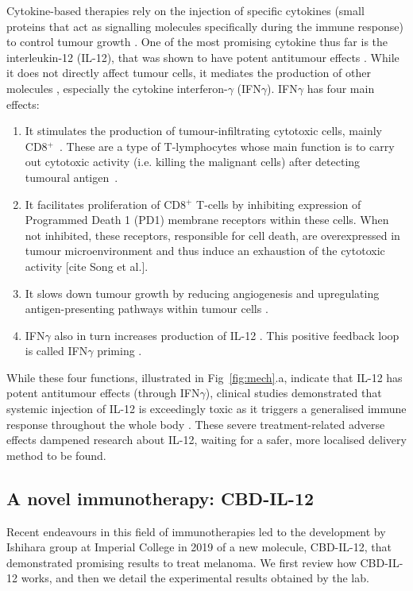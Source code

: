 \documentclass[11pt]{article}
\begin{document}
Cytokine-based therapies rely on the injection of specific cytokines (small proteins that act as signalling molecules specifically during the immune response) to control tumour growth \cite{ioDef}. One of the most promising cytokine thus far is the interleukin-12 (IL-12), that was shown to have potent antitumour effects \cite{il12IsCool}. While it does not directly affect tumour cells, it mediates the production of other molecules \cite{il12CytokineStorm}, especially the cytokine interferon-$\gamma$ (IFN$\gamma$). IFN$\gamma$ has four main effects:
\begin{enumerate}
    \item It stimulates the production of tumour-infiltrating cytotoxic cells, mainly CD8$^+$~\cite{ifngNKProd}\cite{ifnCD8}. These are a type of T-lymphocytes whose main function is to carry out cytotoxic activity (i.e. killing the malignant cells) after detecting tumoural antigen~\cite{cd8Effects}.     
    \item It facilitates proliferation of CD8$^+$ T-cells by inhibiting expression of Programmed Death 1 (PD1) membrane receptors within these cells. When not inhibited, these receptors, responsible for cell death, are overexpressed in tumour microenvironment and thus induce an exhaustion of the cytotoxic activity [cite Song et al.].  
    \item It slows down tumour growth by reducing angiogenesis \cite{ifngAngiogenesis} and upregulating antigen-presenting pathways within tumour cells \cite{ifngAntigenExposure}.
    \item IFN$\gamma$ also in turn increases production of IL-12 \cite{wang}. This positive feedback loop is called IFN$\gamma$ priming \cite{liuifng}\cite{ma2015}.
\end{enumerate}
While these four functions, illustrated in Fig~\ref{fig:mech}.a, indicate that IL-12 has potent antitumour effects (through IFN$\gamma$), clinical studies demonstrated that systemic injection of IL-12 is exceedingly toxic as it triggers a generalised immune response throughout the whole body \cite{clintriAC1}\cite{clintriAC2}. These severe treatment-related adverse effects dampened research about IL-12, waiting for a safer, more localised delivery method to be found.

\subsection{A novel immunotherapy: CBD-IL-12}\label{ssec:cbd}
Recent endeavours in this field of immunotherapies led to the development by Ishihara group at Imperial College in 2019 \cite{cbdil12} of a new molecule, CBD-IL-12, that demonstrated promising results to treat melanoma. We first review how CBD-IL-12 works, and then we detail the experimental results obtained by the lab. 
\end{document}
